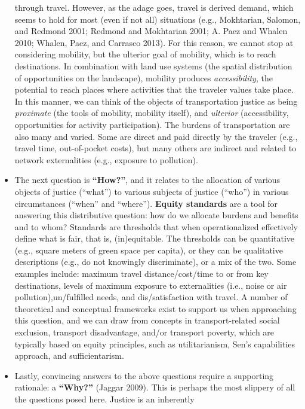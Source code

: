 \documentclass[12pt, oneside]{report}
\begin{document}
\begin{itemize}
  through travel. However, as the adage goes, travel is derived demand,
  which seems to hold for most (even if not all) situations (e.g.,
  Mokhtarian, Salomon, and Redmond 2001; Redmond and Mokhtarian 2001; A.
  Paez and Whalen 2010; Whalen, Paez, and Carrasco 2013). For this
  reason, we cannot stop at considering mobility, but the ulterior goal
  of mobility, which is to reach destinations. In combination with land
  use systems (the spatial distribution of opportunities on the
  landscape), mobility produces \emph{accessibility}, the potential to
  reach places where activities that the traveler values take place. In
  this manner, we can think of the objects of transportation justice as
  being \emph{proximate} (the tools of mobility, mobility itself), and
  \emph{ulterior} (accessibility, opportunities for activity
  participation). The burdens of transportation are also many and
  varied. Some are direct and paid directly by the traveler (e.g.,
  travel time, out-of-pocket costs), but many others are indirect and
  related to network externalities (e.g., exposure to pollution).
\item
  The next question is \textbf{``How?''}, and it relates to the
  allocation of various objects of justice (``what'') to various
  subjects of justice (``who'') in various circumstances (``when'' and
  ``where''). \textbf{Equity standards} are a tool for answering this
  distributive question: how do we allocate burdens and benefits and to
  whom? Standards are thresholds that when operationalized effectively
  define what is fair, that is, (in)equitable. The thresholds can be
  quantitative (e.g., square meters of green space per capita), or they
  can be qualitative descriptions (e.g., do not knowingly discriminate),
  or a mix of the two. Some examples include: maximum travel
  distance/cost/time to or from key destinations, levels of maximum
  exposure to externalities (i.e., noise or air pollution),un/fulfilled
  needs, and dis/satisfaction with travel. A number of theoretical and
  conceptual frameworks exist to support us when approaching this
  question, and we can draw from concepts in transport-related social
  exclusion, transport disadvantage, and/or transport poverty, which are
  typically based on equity principles, such as utilitarianism, Sen's
  capabilities approach, and sufficientarism.
\item
  Lastly, convincing answers to the above questions require a supporting
  rationale: a \textbf{``Why?''} (Jaggar 2009). This is perhaps the most
  slippery of all the questions posed here. Justice is an inherently

\end{itemize}
\end{document}
